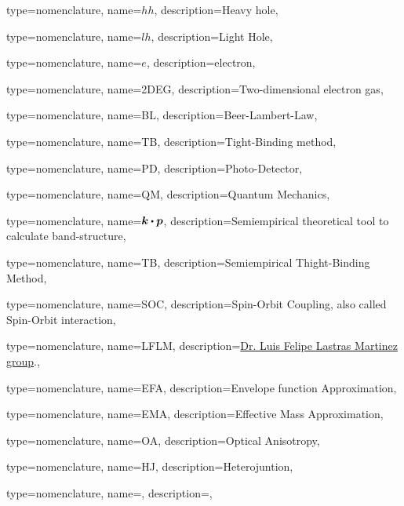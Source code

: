 {type={nomenclature},
name={\ensuremath{hh}},
description={Heavy hole},
}


{type={nomenclature},
name={\ensuremath{lh}},
description={Light Hole},
}

{type={nomenclature},
name={\ensuremath{e}},
description={electron},
}

{type={nomenclature},
name={2DEG},
description={Two-dimensional electron gas},
}

{type={nomenclature},
name={BL},
description={Beer-Lambert-Law},
}

{type={nomenclature},
name={TB},
description={Tight-Binding method},
}

{type={nomenclature},
name={PD},
description={Photo-Detector},
}

{type={nomenclature},
name={QM},
description={Quantum Mechanics},
}

{type={nomenclature},
name={$\boldsymbol{k}\bigcdot \boldsymbol{p}$},
description={Semiempirical theoretical tool to calculate band-structure},
}


{type={nomenclature},
name={TB},
description={Semiempirical Thight-Binding Method},
}


{type={nomenclature},
name={SOC},
description={Spin-Orbit Coupling, also called Spin-Orbit interaction},
}

{type={nomenclature},
name={LFLM},
description={\href{https://github.com/lflm-spectra-labs-iico}{Dr. Luis Felipe Lastras Martinez group}.},
}

{type={nomenclature},
name={EFA},
description={Envelope function Approximation},
}

{type={nomenclature},
name={EMA},
description={Effective Mass Approximation},
}


{type={nomenclature},
name={OA},
description={Optical Anisotropy},
}


{type={nomenclature},
name={HJ},
description={Heterojuntion},
}


\newglossaryentry{}
{type={nomenclature},
name={},
description={},
}



\renewcommand{\glsnamefont}[1]{\textcolor{black}{\textbf{#1}}}
\printunsrtglossary[type=nomenclature,style=long3col]
\printunsrtglossary[type=abbreviations,title={List of codes and packages}]
\printunsrtglossary[type=symbols,]

